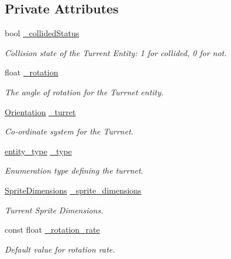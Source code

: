\subsection*{Private Attributes}
\begin{DoxyCompactItemize}
\item 
bool \hyperlink{classTurret_aceb63c533fdc7b332addf9de88336c9c}{\-\_\-collided\-Status}
\begin{DoxyCompactList}\small\item\em Collision state of the Turrent Entity\-: 1 for collided, 0 for not. \end{DoxyCompactList}\item 
float \hyperlink{classTurret_a5570f2cbe1ac6bd008a9fa3b79998756}{\-\_\-rotation}
\begin{DoxyCompactList}\small\item\em The angle of rotation for the Turrnet entity. \end{DoxyCompactList}\item 
\hyperlink{classOrientation}{Orientation} \hyperlink{classTurret_a71caf1801690ed81facba1f4cc99defd}{\-\_\-turret}
\begin{DoxyCompactList}\small\item\em Co-\/ordinate system for the Turrnet. \end{DoxyCompactList}\item 
\hyperlink{Structures_8h_a6d8f83e710b27d4f86c45f0bb77066e3}{entity\-\_\-type} \hyperlink{classTurret_afadbbb1f31cce1eb6b267afebebd14f0}{\-\_\-type}
\begin{DoxyCompactList}\small\item\em Enumeration type defining the turrnet. \end{DoxyCompactList}\item 
\hyperlink{classSpriteDimensions}{Sprite\-Dimensions} \hyperlink{classTurret_aca4002cdadaf5f3e9ae210ba5d2e7244}{\-\_\-sprite\-\_\-dimensions}
\begin{DoxyCompactList}\small\item\em Turrent Sprite Dimensions. \end{DoxyCompactList}\item 
const float \hyperlink{classTurret_abd03fe34cbb67d081002b4fa3b60be71}{\-\_\-rotation\-\_\-rate}
\begin{DoxyCompactList}\small\item\em Default value for rotation rate. \end{DoxyCompactList}\end{DoxyCompactItemize}


